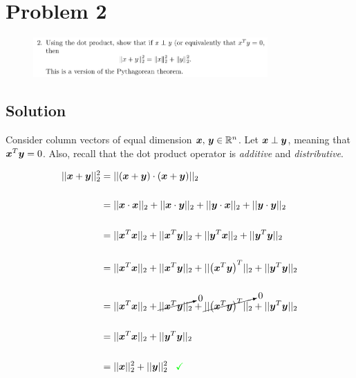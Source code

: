 
\begingroup
\allowdisplaybreaks

\newpage
\section*{Problem 2}

\begin{figure}[h]
	\centering
	\includegraphics[width=0.8\textwidth]{./images/prob2_statement.png}
\end{figure}

\subsection*{Solution}

Consider column vectors of equal dimension $\boldsymbol{x},\,\boldsymbol{y} \in \mathbb{R}^{n}$. Let $\boldsymbol{x} \perp \boldsymbol{y}$, meaning that $\boldsymbol{x}^T \boldsymbol{y} = 0$. Also, recall that the dot product operator is \textit{additive} and \textit{distributive}.

\begin{align*}
	|| {\boldsymbol{x} + \boldsymbol{y}} ||_2^2 &= || {\left(\boldsymbol{x} + \boldsymbol{y}\right) \cdot \left(\boldsymbol{x} + \boldsymbol{y}\right)} ||_2 \\
	\\
	&= || {\boldsymbol{x} \cdot \boldsymbol{x}} ||_2 + || {\boldsymbol{x} \cdot \boldsymbol{y}} ||_2 + || {\boldsymbol{y} \cdot \boldsymbol{x}} ||_2 + || {\boldsymbol{y} \cdot \boldsymbol{y}} ||_2 \\
	\\
	&= || {\boldsymbol{x}^T\boldsymbol{x}} ||_2 + || {\boldsymbol{x}^T\boldsymbol{y}} ||_2 + || {\boldsymbol{y}^T\boldsymbol{x}} ||_2 + || {\boldsymbol{y}^T\boldsymbol{y}} ||_2 \\
	\\
	&= || {\boldsymbol{x}^T\boldsymbol{x}} ||_2 + || {\boldsymbol{x}^T\boldsymbol{y}} ||_2 + || {\left(\boldsymbol{x}^T\boldsymbol{y}\right)^T} ||_2 +|| {\boldsymbol{y}^T\boldsymbol{y}} ||_2 \\
	\\
	&= || {\boldsymbol{x}^T\boldsymbol{x}} ||_2 + \cancelto{0}{|| {\boldsymbol{x}^T\boldsymbol{y}} ||_2} + \cancelto{0}{|| {\left(\boldsymbol{x}^T\boldsymbol{y}\right)^T} ||_2} + || {\boldsymbol{y}^T\boldsymbol{y}} ||_2 \\
	\\
	&= || {\boldsymbol{x}^T\boldsymbol{x}} ||_2 + || {\boldsymbol{y}^T\boldsymbol{y}} ||_2 \\
	\\
	&= || {\boldsymbol{x}} ||_2^2 + || {\boldsymbol{y}} ||_2^2 \,\,\,\,\, \textcolor{green}{\checkmark}
\end{align*}



